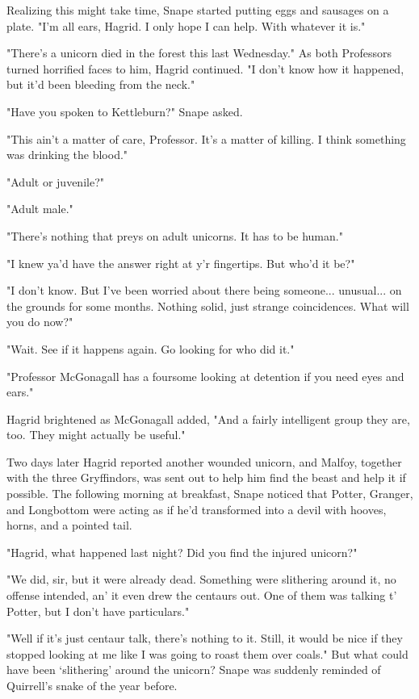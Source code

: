 Realizing this might take time, Snape started putting eggs and sausages on a plate. "I'm all ears, Hagrid. I only hope I can help. With whatever it is."

"There's a unicorn died in the forest this last Wednesday." As both Professors turned horrified faces to him, Hagrid continued. "I don't know how it happened, but it'd been bleeding from the neck."

"Have you spoken to Kettleburn?" Snape asked.

"This ain't a matter of care, Professor. It's a matter of killing. I think something was drinking the blood."

"Adult or juvenile?"

"Adult male."

"There's nothing that preys on adult unicorns. It has to be human."

"I knew ya'd have the answer right at y'r fingertips. But who'd it be?"

"I don't know. But I've been worried about there being someone... unusual... on the grounds for some months. Nothing solid, just strange coincidences. What will you do now?"

"Wait. See if it happens again. Go looking for who did it."

"Professor McGonagall has a foursome looking at detention if you need eyes and ears."

Hagrid brightened as McGonagall added, "And a fairly intelligent group they are, too. They might actually be useful."

Two days later Hagrid reported another wounded unicorn, and Malfoy, together with the three Gryffindors, was sent out to help him find the beast and help it if possible. The following morning at breakfast, Snape noticed that Potter, Granger, and Longbottom were acting as if he'd transformed into a devil with hooves, horns, and a pointed tail.

"Hagrid, what happened last night? Did you find the injured unicorn?"

"We did, sir, but it were already dead. Something were slithering around it, no offense intended, an' it even drew the centaurs out. One of them was talking t' Potter, but I don't have particulars."

"Well if it's just centaur talk, there's nothing to it. Still, it would be nice if they stopped looking at me like I was going to roast them over coals." But what could have been `slithering' around the unicorn? Snape was suddenly reminded of Quirrell's snake of the year before.

